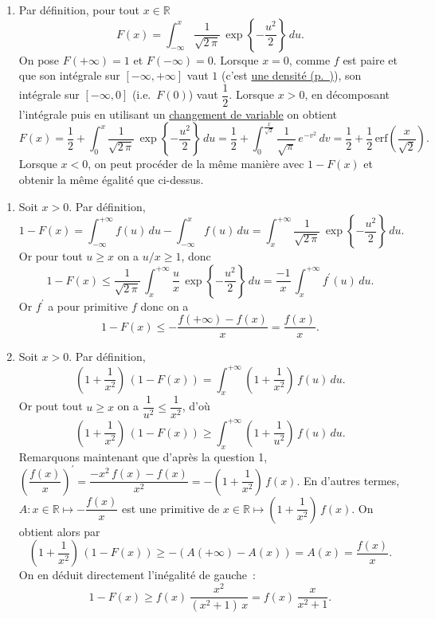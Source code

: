 \begin{enumerate}
\def\labelenumi{\arabic{enumi}.}
\setcounter{enumi}{1}
\tightlist
\item
  Par définition, pour tout \(x\in\mathbb{R}\)
  \[ F(x) = \int_{-\infty}^x \dfrac{1}{\sqrt{2\,\pi}}\,\exp\left\{-\dfrac{u^2}{2}\right\}\,du.\]
  On pose \(F(+\infty) = 1\) et \(F(-\infty) = 0\). Lorsque \(x = 0\),
  comme \(f\) est paire et que son intégrale sur \([-\infty,+\infty]\)
  vaut \(1\) (c'est \protect\hyperref[I-defdens]{une
  densité (p.~\pageref*{I-defdens})}), son intégrale sur \([-\infty,0]\)
  (i.e.~\(F(0)\)) vaut \(\dfrac{1}{2}\). Lorsque \(x > 0\), en
  décomposant l'intégrale puis en utilisant un
  \href{Calcul\%20Intégral\%20I.pdf\%20\#changement-de-variable}{changement
  de variable} on obtient
  \[F(x) = \dfrac{1}{2} + \int_{0}^x \dfrac{1}{\sqrt{2\,\pi}}\,\exp\left\{-\dfrac{u^2}{2}\right\}\,du = \dfrac{1}{2} + \int_{0}^{\frac{x}{\sqrt{2}}} \dfrac{1}{\sqrt{\pi}}\,e^{-v^2}\,dv = \dfrac{1}{2} + \dfrac{1}{2}\,\text{erf}\left(\dfrac{x}{\sqrt{2}}\right).\]
  Lorsque \(x<0\), on peut procéder de la même manière avec \(1 - F(x)\)
  et obtenir la même égalité que ci-dessus.
\end{enumerate}

\label{I-answer-fdrgaussenca}

\begin{enumerate}
\def\labelenumi{\arabic{enumi}.}
\setcounter{enumi}{2}
\item
  Soit \(x>0\). Par définition,
  \[1 - F(x) = \int_{-\infty}^{+\infty} f(u)\,du - \int_{-\infty}^x f(u)\,du = \int_{x}^{+\infty} \dfrac{1}{\sqrt{2\,\pi}}\,\exp\left\{-\dfrac{u^2}{2}\right\}\,du. \]
  Or pour tout \(u\geq x\) on a \(u/x \geq 1\), donc
  \[1 - F(x) \leq \dfrac{1}{\sqrt{2\,\pi}}\,\int_{x}^{+\infty} \dfrac{u}{x}\, \exp\left\{-\dfrac{u^2}{2}\right\}\,du = \dfrac{-1}{x}\,\int_{x}^{+\infty} f^\prime(u)\,du. \]
  Or \(f^\prime\) a pour primitive \(f\) donc on a
  \[1-F(x) \leq -\dfrac{f(+\infty) - f(x)}{x} = \dfrac{f(x)}{x}. \]
\item
  Soit \(x>0\). Par définition,
  \[\left(1 + \dfrac{1}{x^2}\right)\,\left(1-F(x)\right) = \int_x^{+\infty} \left(1 + \dfrac{1}{x^2} \right)\,f(u)\,du.\]
  Or pout tout \(u \geq x\) on a \(\dfrac{1}{u^2} \leq \dfrac{1}{x^2}\),
  d'où
  \[\left(1 + \dfrac{1}{x^2}\right)\,\left(1-F(x)\right) \geq \int_{x}^{+\infty} \left( 1 + \dfrac{1}{u^2} \right)\,f(u)\,du.\]
  Remarquons maintenant que d'après la question 1,
  \(\left(\dfrac{f(x)}{x} \right)^\prime = \dfrac{-x^2\,f(x) - f(x)}{x^2} = -\left(1+\dfrac{1}{x^2}\right)\,f(x)\).
  En d'autres termes, \(A : x\in\mathbb{R}\mapsto -\dfrac{f(x)}{x}\) est
  une primitive de
  \(x\in\mathbb{R}\mapsto \left(1+\dfrac{1}{x^2}\right)\,f(x)\). On
  obtient alors par
  \[\left(1 + \dfrac{1}{x^2}\right)\,\left(1-F(x)\right) \geq - \left(A(+\infty) - A(x)\right) = A(x) = \dfrac{f(x)}{x}.\]
  On en déduit directement l'inégalité de gauche~:
  \[ 1-F(x) \geq f(x)\,\dfrac{x^2}{(x^2+1)\,x} = f(x)\,\dfrac{x}{x^2+1}. \]
\end{enumerate}


